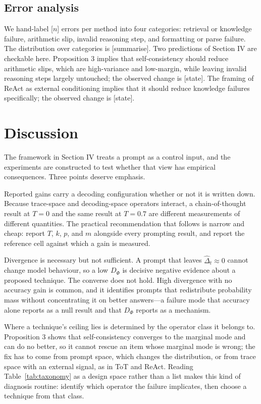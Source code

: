 \documentclass[conference]{IEEEtran}
\begin{document}
\subsection{Error analysis}
\label{sec:error}

We hand-label \textcolor{BrickRed}{[$n$]} errors per method into four categories: retrieval or knowledge failure, arithmetic slip, invalid reasoning step, and formatting or parse failure. The distribution over categories is \textcolor{BrickRed}{[summarise]}. Two predictions of Section IV are checkable here. Proposition 3 implies that self-consistency should reduce arithmetic slips, which are high-variance and low-margin, while leaving invalid reasoning steps largely untouched; the observed change is \textcolor{BrickRed}{[state]}. The framing of ReAct as external conditioning implies that it should reduce knowledge failures specifically; the observed change is \textcolor{BrickRed}{[state]}.

\section{Discussion}
\label{sec:discussion}

The framework in Section IV treats a prompt as a control input, and the experiments are constructed to test whether that view has empirical consequences. Three points deserve emphasis.

Reported gains carry a decoding configuration whether or not it is written down. Because trace-space and decoding-space operators interact, a chain-of-thought result at $T = 0$ and the same result at $T = 0.7$ are different measurements of different quantities. The practical recommendation that follows is narrow and cheap: report $T$, $k$, $p$, and $m$ alongside every prompting result, and report the reference cell against which a gain is measured.

Divergence is necessary but not sufficient. A prompt that leaves $\hat{\Delta}_{t} \approx 0$ cannot change model behaviour, so a low $D_{\Phi}$ is decisive negative evidence about a proposed technique. The converse does not hold. High divergence with no accuracy gain is common, and it identifies prompts that redistribute probability mass without concentrating it on better answers---a failure mode that accuracy alone reports as a null result and that $D_{\Phi}$ reports as a mechanism.

Where a technique's ceiling lies is determined by the operator class it belongs to. Proposition 3 shows that self-consistency converges to the marginal mode and can do no better, so it cannot rescue an item whose marginal mode is wrong; the fix has to come from prompt space, which changes the distribution, or from trace space with an external signal, as in ToT and ReAct. Reading Table~\ref{tab:taxonomy} as a design space rather than a list makes this kind of diagnosis routine: identify which operator the failure implicates, then choose a technique from that class.
\end{document}
